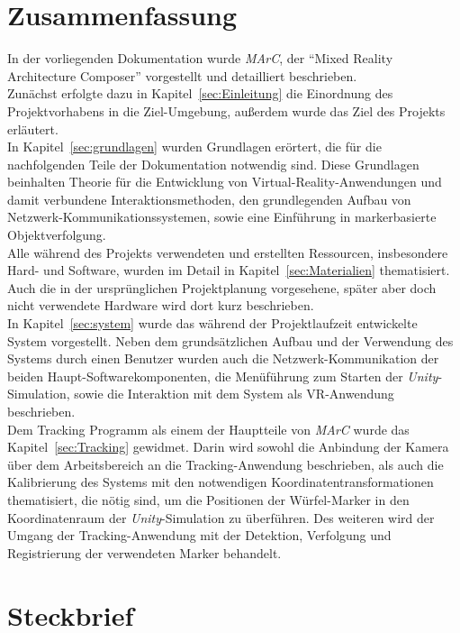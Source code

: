 \section{Zusammenfassung}
In der vorliegenden Dokumentation wurde \emph{MArC}, der "`Mixed Reality Architecture Composer"' vorgestellt und detailliert beschrieben.\\
Zunächst erfolgte dazu in Kapitel~\ref{sec:Einleitung} die Einordnung des Projektvorhabens in die Ziel-Umgebung, außerdem wurde das Ziel des Projekts erläutert.\\
In Kapitel~\ref{sec:grundlagen} wurden Grundlagen erörtert, die für die nachfolgenden Teile der Dokumentation notwendig sind. Diese Grundlagen beinhalten Theorie für die Entwicklung von Virtual-Reality-Anwendungen und damit verbundene Interaktionsmethoden, den grundlegenden Aufbau von Netz\-werk-Kom\-mu\-ni\-ka\-tions\-systemen, sowie eine Einführung in markerbasierte Objektverfolgung.\\
Alle während des Projekts verwendeten und erstellten Ressourcen, insbesondere Hard- und Software, wurden im Detail in Kapitel~\ref{sec:Materialien} thematisiert. Auch die in der ursprünglichen Projektplanung vorgesehene, später aber doch nicht verwendete Hardware wird dort kurz beschrieben.\\
In Kapitel~\ref{sec:system} wurde das während der Projektlaufzeit entwickelte System vorgestellt. Neben dem grundsätzlichen Aufbau und der Verwendung des Systems durch einen Benutzer wurden auch die Netzwerk-Kommunikation der beiden Haupt-Soft\-ware\-kom\-po\-nen\-ten, die Menüführung zum Starten der \emph{Unity}-Simulation, sowie die Interaktion mit dem System als VR-Anwendung beschrieben.\\
Dem Tracking Programm als einem der Hauptteile von \emph{MArC} wurde das Kapitel~\ref{sec:Tracking} gewidmet. Darin wird sowohl die Anbindung der Kamera über dem Arbeitsbereich an die Tracking-Anwendung beschrieben, als auch die Kalibrierung des Systems mit den notwendigen Koordinatentransformationen thematisiert, die nötig sind, um die Positionen der Würfel-Marker in den Koordinatenraum der \emph{Unity}-Simulation zu überführen. Des weiteren wird der Umgang der Tracking-Anwendung mit der Detektion, Verfolgung und Registrierung der verwendeten Marker behandelt.\\

\section{Steckbrief}